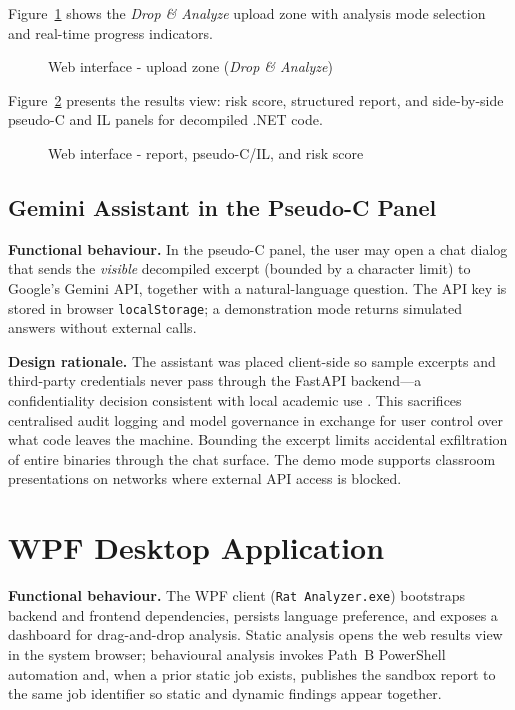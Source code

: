 Figure~\ref{fig:web-upload} shows the \emph{Drop \& Analyze} upload zone with analysis mode
selection and real-time progress indicators.

\begin{figure}[H]
    \centering
    \caption{Web interface - upload zone (\emph{Drop \& Analyze})}
    \label{fig:web-upload}
\end{figure}

Figure~\ref{fig:web-results} presents the results view: risk score, structured report, and
side-by-side pseudo-C and IL panels for decompiled .NET code.

\begin{figure}[H]
    \centering
    \caption{Web interface - report, pseudo-C/IL, and risk score}
    \label{fig:web-results}
\end{figure}

\subsection{Gemini Assistant in the Pseudo-C Panel}

\textbf{Functional behaviour.}
In the pseudo-C panel, the user may open a chat dialog that sends the \emph{visible} decompiled
excerpt (bounded by a character limit) to Google's Gemini API, together with a natural-language
question. The API key is stored in browser \texttt{localStorage}; a demonstration mode returns
simulated answers without external calls.

\textbf{Design rationale.}
The assistant was placed client-side so sample excerpts and third-party credentials never pass
through the FastAPI backend---a confidentiality decision consistent with local academic use
\cite{galli2024}. This sacrifices centralised audit logging and model governance in exchange for
user control over what code leaves the machine. Bounding the excerpt limits accidental exfiltration
of entire binaries through the chat surface. The demo mode supports classroom presentations on
networks where external API access is blocked.

\section{WPF Desktop Application}

\textbf{Functional behaviour.}
The WPF client (\texttt{Rat Analyzer.exe}) bootstraps backend and frontend dependencies, persists
language preference, and exposes a dashboard for drag-and-drop analysis. Static analysis opens the
web results view in the system browser; behavioural analysis invokes Path~B PowerShell automation
and, when a prior static job exists, publishes the sandbox report to the same job identifier so
static and dynamic findings appear together.

